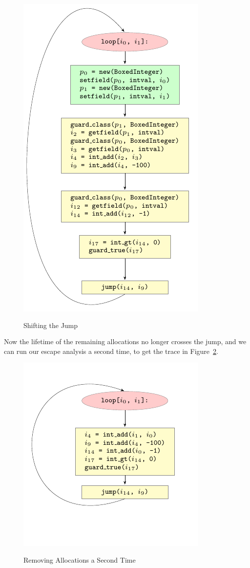 \documentclass{sigplanconf}
\begin{document}
\begin{figure}
\includegraphics{figures/step2.pdf}
\label{fig:step2}
\caption{Shifting the Jump}
\end{figure}


Now the lifetime of the remaining allocations no longer crosses the jump, and
we can run our escape analysis a second time, to get the trace in
Figure~\ref{fig:step3}.

\begin{figure}
\includegraphics{figures/step3.pdf}
\label{fig:step3}
\caption{Removing Allocations a Second Time}
\end{figure}
\end{document}
